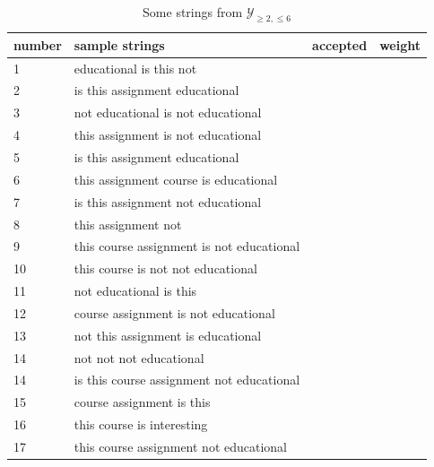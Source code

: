 \documentclass{article}
\begin{document}
\begin{table}[h]
        \centering
        \fontsize{10}{10}\selectfont
        \renewcommand{\arraystretch}{1.2} %
        \setlength{\tabcolsep}{0.5em} %
        \begin{tabular}{l|l|l|l}
        \textbf{number} & \textbf{sample strings} & \textbf{accepted} & \textbf{weight} \\ \hline
        1 & educational is this not &  &  \\
        2 & is this assignment educational &  &  \\
        3 & not educational is not educational &  &  \\
        4 & this assignment is not educational &  &  \\
        5 & is this assignment educational &  &  \\
        6 & this assignment course is educational &  &  \\
        7 & is this assignment not educational &  &  \\
        8 & this assignment not &  &  \\
        9 & this course assignment is not educational &  &  \\
        10 & this course is not not educational &  &  \\
        11 & not educational is this &  &  \\
        12 & course assignment is not educational &  &  \\
        13 & not this assignment is educational &  &  \\
        14 & not not not educational &  &  \\
        14 & is this course assignment not educational &  &  \\
        15 & course assignment is this &  &  \\
        16 & this course is interesting &  &  \\
        17 & this course assignment not educational &  & 
        \end{tabular}
        \caption{Some strings from $\mathcal{Y}_{\geq 2, \leq 6}$}
        \label{tab:wfst_strings}
        \end{table}
        
\end{document}
